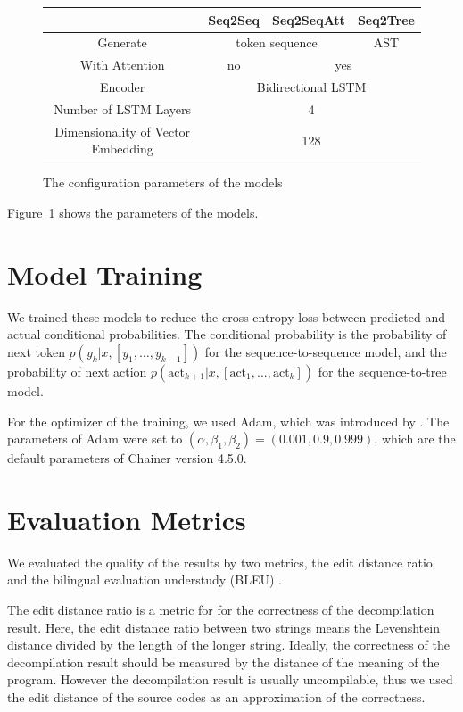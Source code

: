 \documentclass[senior,final,11pt]{iscs-thesis}
\begin{document}
\begin{figure}[t]
	\caption{The configuration parameters of the models}
	\begin{tabular}{|c||c|c|c|}
		\hline
		  & Seq2Seq & Seq2SeqAtt & Seq2Tree \\ \hline \hline
		 Generate & \multicolumn{2}{|c|}{token sequence} & AST \\ \hline
		 With Attention & no & \multicolumn{2}{|c|}{yes} \\ \hline
		 Encoder & \multicolumn{3}{|c|}{Bidirectional LSTM} \\ \hline
		Number of LSTM Layers & \multicolumn{3}{|c|}{4} \\ \hline
		Dimensionality of Vector Embedding & \multicolumn{3}{|c|}{128} \\ \hline
	\end{tabular}
	\label{fig:parameterofmodels}
\end{figure}

Figure~\ref{fig:parameterofmodels} shows the parameters of the models. 


\section{Model Training}
We trained these models to reduce the cross-entropy loss between predicted and actual conditional probabilities.
The conditional probability is the probability of next token $ p(y_k|x,[y_1,\dots,y_{k-1}]) $ for the sequence-to-sequence model, 
and the probability of next action $p(\mathrm{act}_{k+1}|x,[\mathrm{act}_1, \dots, \mathrm{act}_{k}]) $ for the sequence-to-tree model.

For the optimizer of the training, we used Adam, which was introduced by \citet{Adam}.
The parameters of Adam were set to $ (\alpha,\beta_1,\beta_2) = (0.001,0.9,0.999) $, which are the default parameters of Chainer version 4.5.0.

\section{Evaluation Metrics}
We evaluated the quality of the results by two metrics, 
the edit distance ratio \citep{Motoneta} and the bilingual evaluation understudy (BLEU) \citep{BLEU}.

The edit distance ratio is a metric for for the correctness of the decompilation result.
Here, the edit distance ratio between two strings means the Levenshtein distance \citep{levensthein_dist} divided by the length of the longer string.
Ideally, the correctness of the decompilation result should be measured by the distance of the meaning of the program.
However the decompilation result is usually uncompilable, 
thus we used the edit distance of the source codes as an approximation of the correctness.
\end{document}
